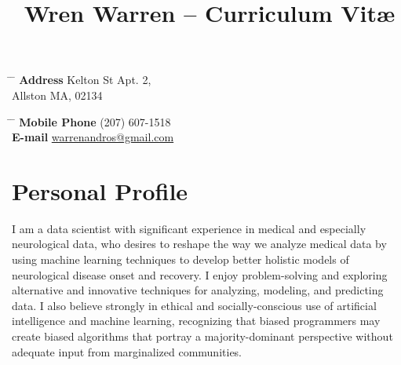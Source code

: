 \documentclass[10pt]{article} %
\begin{document}

\title{Wren Warren -- Curriculum Vit\ae} %


\parbox{0.5\textwidth}{ %
\begin{tabbing} %
\hspace{3cm} \= \hspace{4cm} \= \kill %
{\bf Address}  Kelton St Apt. 2,\\ %
\> Allston MA, 02134 \\ %

\end{tabbing}}
\hfill %
\parbox{0.5\textwidth}{ %
\begin{tabbing} %
\hspace{3cm} \= \hspace{4cm} \= \kill %
{\bf Mobile Phone} \> (207) 607-1518 \\ %
{\bf E-mail} \> \href{mailto:warrenandros@gmail.com}{warrenandros@gmail.com} \\ %
\end{tabbing}}


\section{Personal Profile}

I am a data scientist with significant experience in medical and especially neurological data, who desires to reshape the way we analyze medical data by using machine learning techniques to develop better holistic models of neurological disease onset and recovery. I enjoy problem-solving and exploring alternative and innovative techniques for analyzing, modeling, and predicting data. I also believe strongly in ethical and socially-conscious use of artificial intelligence and machine learning, recognizing that biased programmers may create biased algorithms that portray a majority-dominant perspective without adequate input from marginalized communities.
\end{document}
